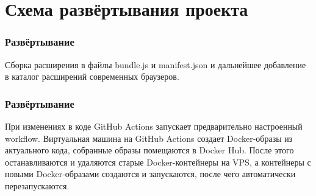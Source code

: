 		\subsection{\Extension{}}
	\section{Схема развёртывания проекта}
		\subsubsection{Развёртывание \Extensionbf{}}
			Сборка расширения в файлы bundle.js и manifest.json и дальнейшее добавление в каталог расширений современных браузеров.
		\subsubsection{Развёртывание \Server{}}
			При изменениях в коде GitHub Actions запускает предварительно настроенный workflow. Виртуальная 	машина на GitHub Actions создает Docker-образы из актуального кода, собранные образы помещаются в Docker Hub. После этого останавливаются и удаляются старые Docker-контейнеры на VPS, а контейнеры 
			с новыми Docker-образами создаются и запускаются, после чего \Serverbf{} автоматически перезапускаются.
